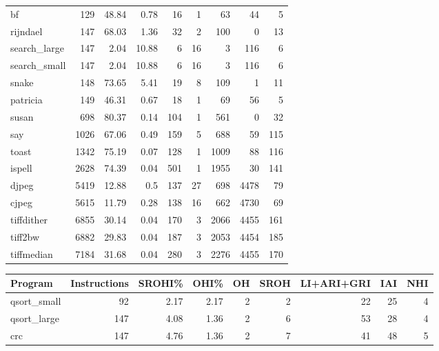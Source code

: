 \begin{tabular}{lrrrrrrrr}
 bf              &      129 &    48.84 &   0.78 &   16 &    1 &     63 &    44 &     5 \\
 rijndael        &      147 &    68.03 &   1.36 &   32 &    2 &    100 &     0 &    13 \\
 search\_large    &      147 &     2.04 &  10.88 &    6 &   16 &      3 &   116 &     6 \\
 search\_small    &      147 &     2.04 &  10.88 &    6 &   16 &      3 &   116 &     6 \\
 snake           &      148 &    73.65 &   5.41 &   19 &    8 &    109 &     1 &    11 \\
 patricia        &      149 &    46.31 &   0.67 &   18 &    1 &     69 &    56 &     5 \\
 susan           &      698 &    80.37 &   0.14 &  104 &    1 &    561 &     0 &    32 \\
 say             &     1026 &    67.06 &   0.49 &  159 &    5 &    688 &    59 &   115 \\
 toast           &     1342 &    75.19 &   0.07 &  128 &    1 &   1009 &    88 &   116 \\
 ispell          &     2628 &    74.39 &   0.04 &  501 &    1 &   1955 &    30 &   141 \\
 djpeg           &     5419 &    12.88 &   0.5  &  137 &   27 &    698 &  4478 &    79 \\
 cjpeg           &     5615 &    11.79 &   0.28 &  138 &   16 &    662 &  4730 &    69 \\
 tiffdither      &     6855 &    30.14 &   0.04 &  170 &    3 &   2066 &  4455 &   161 \\
 tiff2bw         &     6882 &    29.83 &   0.04 &  187 &    3 &   2053 &  4454 &   185 \\
 tiffmedian      &     7184 &    31.68 &   0.04 &  280 &    3 &   2276 &  4455 &   170 \\
\hline
\end{tabular}\begin{tabular}{lrrrrrrrr}
\hline
 Program         &   Instructions &   SROHI\% &   OHI\% &   OH &   SROH &   LI+ARI+GRI &   IAI &   NHI \\
\hline
 qsort\_small     &             92 &     2.17 &   2.17 &    2 &      2 &           22 &    25 &     4 \\
 qsort\_large     &            147 &     4.08 &   1.36 &    2 &      6 &           53 &    28 &     4 \\
 crc             &            147 &     4.76 &   1.36 &    2 &      7 &           41 &    48 &     5 \\

\end{tabular}
